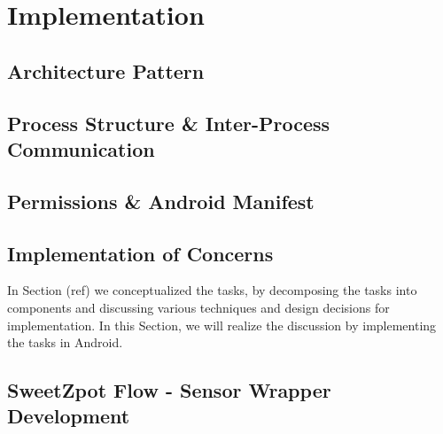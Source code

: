 \chapter{Implementation}

\section{Architecture Pattern}


\section{Process Structure \& Inter-Process Communication}
\section{Permissions \& Android Manifest}

\section{Implementation of Concerns}
In Section (ref) we conceptualized the tasks, by decomposing the tasks into components and discussing various techniques and design decisions for implementation. In this Section, we will realize the discussion by implementing the tasks in Android. 




\section{SweetZpot Flow - Sensor Wrapper Development}